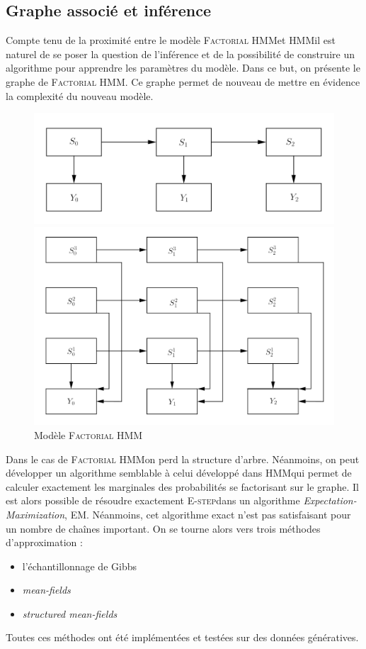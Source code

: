 \documentclass[10pt,a4paper]{article}
\newcommand{\hmm}{\textsc{HMM}}
\newcommand{\fhmm}{\textsc{Factorial HMM}}
\newcommand{\Estep}{\textsc{E-step}}
\newcommand{\EM}{\textsc{EM}}
\begin{document}
\subsection{Graphe associé et inférence} 
Compte tenu de la proximité entre le modèle \fhmm et \hmm il est naturel de se poser la question de l'inférence et de la possibilité de construire un algorithme pour apprendre les paramètres du modèle. Dans ce but, on présente le graphe de \fhmm. Ce graphe permet de nouveau de mettre en évidence la complexité du nouveau modèle.
\begin{figure}[H]
\centering
\begin{minipage}{.46\linewidth}
\centering
\includegraphics[scale=0.2]{graph1.png}
\caption{Modèle \hmm}
\end{minipage}
\begin{minipage}{.46\linewidth}
\centering
\includegraphics[scale=0.2]{graph2.png}
\caption{Modèle \fhmm}
\end{minipage}
\end{figure}
Dans le cas de \fhmm on perd la structure d'arbre. Néanmoins, on peut développer un algorithme semblable à celui développé dans \hmm qui permet de calculer exactement les marginales des probabilités se factorisant sur le graphe. Il est alors possible de résoudre exactement \Estep dans un algorithme \emph{Expectation-Maximization}, \EM. Néanmoins, cet algorithme exact n'est pas satisfaisant pour un nombre de chaînes important. On se tourne alors vers trois méthodes d'approximation :
\begin{itemize}
\item l'échantillonnage de Gibbs
\item \textit{mean-fields}
\item \textit{structured mean-fields}
\end{itemize}
Toutes ces méthodes ont été implémentées et testées sur des données génératives.
\end{document}
